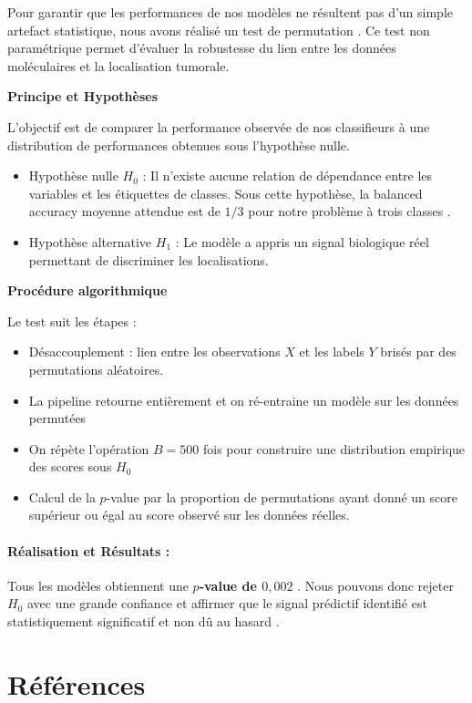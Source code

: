 \documentclass[a4paper,11pt]{paper}
\theoremstyle{plain}
\theoremstyle{definition}
\theoremstyle{remark}
\begin{document}
Pour garantir que les performances de nos modèles ne résultent pas d'un simple artefact statistique, nous avons réalisé un test de permutation \cite{ojala2010permutation}. Ce test non paramétrique permet d'évaluer la robustesse du lien entre les données moléculaires et la localisation tumorale.

\textbf{Principe et Hypothèses}

L'objectif est de comparer la performance observée de nos classifieurs à une distribution de performances obtenues sous l'hypothèse nulle.
\begin{itemize}
    \item  Hypothèse nulle $H_0$ : Il n'existe aucune relation de dépendance entre les variables et les étiquettes de classes. Sous cette hypothèse, la balanced accuracy moyenne attendue est de $1/3$ pour notre problème à trois classes .
    \item Hypothèse alternative $H_1$ : Le modèle a appris un signal biologique réel permettant de discriminer les localisations.
\end{itemize}

\bigskip

\textbf{Procédure algorithmique}

\bigskip

Le test suit les étapes :
\begin{itemize}
    \item Désaccouplement : lien entre les observations $X$ et les labels $Y$ brisés par des permutations aléatoires.
    \item La pipeline retourne entièrement et on ré-entraine un modèle sur les données permutées
    \item On répète l'opération $B = 500$ fois pour construire une distribution empirique des scores sous $H_0$
    \item Calcul de la $p$-value par la proportion de permutations ayant donné un score supérieur ou égal au score observé sur les données réelles.
\end{itemize}

\paragraph{Réalisation et Résultats :}

Tous les modèles obtiennent une \textbf{$p$-value de $0,002$} . Nous pouvons donc rejeter $H_0$ avec une grande confiance et affirmer que le signal prédictif identifié est statistiquement significatif et non dû au hasard .


\newpage

\nocite{ding2022cooperative,tenenhaus2011rgcca,tenenhaus2014sgcca,meinshausen2010stability,tibshirani1996lasso,zou2005elasticnet,friedman2010glmnet,tibshirani2005fusedlasso,chawla2002smote,efron1979bootstrap,ojala2010permutation}
\section*{Références}
\printbibliography[heading=none]
\label{sec:sources}
\end{document}
